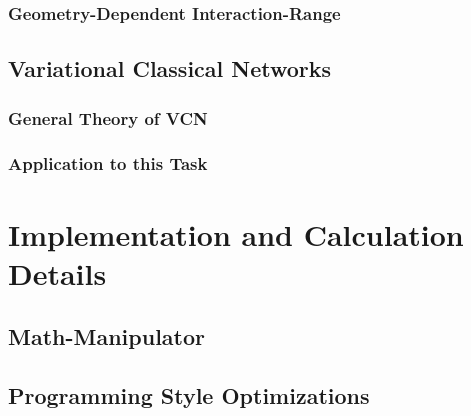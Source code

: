 \documentclass[
headings=optiontohead,              %
12pt,                               %
DIV=13,                             %
twoside=false,                      %
open=right,                         %
BCOR=00mm,                          %
toc=bibliographynumbered            %
]{scrreport}
\begin{document}
        \subsection{Geometry-Dependent Interaction-Range}
        \label{sec:theory-optimizations-geometry}
        
        \FloatBarrier

    \section{Variational Classical Networks}
        \cite{neuralNetworkQuantumStates} %
        
        \subsection{General Theory of VCN}
        \cite{originalDerivationTimeDependendVariationalPrinciple} %
        \cite{TDVPcomplexPrefactors} %
        \cite{complexDifferentiation} %
        \cite{probabilitySamplingRequirementVCN} %
        \cite{VCNsolutionForRBM} %

        \subsection{Application to this Task}
        

\chapter{Implementation and Calculation Details}
\label{sec:implementation-details}

\FloatBarrier

    \section{Math-Manipulator}
    \cite{compilersDragonBook}

    \section{Programming Style Optimizations}
\end{document}
